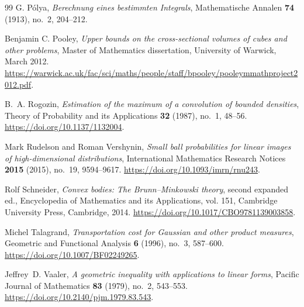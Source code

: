 \documentclass[11pt,a4paper]{article}
\theoremstyle{remark}\newtheorem{remark}[theorem]{Remark}
\numberwithin{equation}{section}
\begin{document}
\begin{thebibliography}{99}
G. P\'olya, \emph{Berechnung eines bestimmten Integrals},
Mathematische Annalen \textbf{74} (1913), no.~2, 204--212.

Benjamin C. Pooley, \emph{Upper bounds on the cross-sectional volumes of
  cubes and other problems}, Master of Mathematics dissertation,
  University of Warwick, March 2012.
\newblock \url{https://warwick.ac.uk/fac/sci/maths/people/staff/bpooley/pooleymmathproject2012.pdf}.

B.~A. Rogozin, \emph{Estimation of the maximum of a convolution of bounded
  densities}, Theory of Probability and its Applications \textbf{32} (1987),
  no.~1, 48--56.
\newblock \url{https://doi.org/10.1137/1132004}.

Mark Rudelson and Roman Vershynin, \emph{Small ball probabilities for linear images of high-dimensional distributions},
International Mathematics Research Notices \textbf{2015} (2015), no.~19, 9594--9617.
\newblock \url{https://doi.org/10.1093/imrn/rnu243}.

Rolf Schneider, \emph{Convex bodies: The {Brunn--Minkowski} theory}, second
  expanded ed., Encyclopedia of Mathematics and its Applications, vol. 151,
  Cambridge University Press, Cambridge, 2014.
\newblock \url{https://doi.org/10.1017/CBO9781139003858}.

Michel Talagrand, \emph{Transportation cost for {Gaussian} and other product
  measures}, Geometric and Functional Analysis \textbf{6} (1996), no.~3,
  587--600.
\newblock \url{https://doi.org/10.1007/BF02249265}.

Jeffrey~D. Vaaler, \emph{A geometric inequality with applications to linear
  forms}, Pacific Journal of Mathematics \textbf{83} (1979), no.~2, 543--553.
\newblock \url{https://doi.org/10.2140/pjm.1979.83.543}.

\end{thebibliography}
\end{document}
